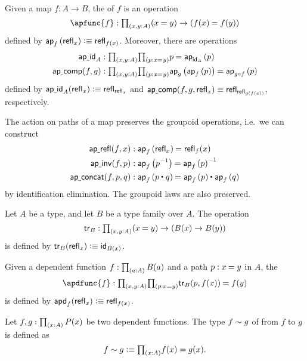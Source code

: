 Given a map $f:A\to B$, the  of $f$ is an operation
\begin{equation*}
\apfunc{f} : \prd{x,y:A} (\id{x}{y})\to(\id{f(x)}{f(y)})
\end{equation*}
defined by $\ap{f}{\refl{x}}\defeq\refl{f(x)}$. 
Moreover, there are operations
\begin{align*}
\apid_A & : \prd{x,y:A}{p:\id{x}{y}} \id{p}{\ap{\idfunc[A]}{p}} \\
\apcomp(f,g) & : \prd{x,y:A}{p:\id{x}{y}} \id{\ap{g}{\ap{f}{p}}}{\ap{g\circ f}{p}}
\end{align*}
defined by $\apid_A(\refl{x})\defeq \refl{\refl{x}}$ and $\apcomp(f,g,\refl{x})\jdeq \refl{\refl{g(f(x))}}$, respectively.

The action on paths of a map preserves the groupoid operations, i.e.~we can construct
\begin{align*}
\aprefl(f,x) & : \id{\ap{f}{\refl{x}}}{\refl{f}(x)} \\
\apinv(f,p) & : \id{\ap{f}{p^{-1}}}{\ap{f}{p}^{-1}} \\
\apconcat(f,p,q) & : \id{\ap{f}{\ct{p}{q}}}{\ct{\ap{f}{p}}{\ap{f}{q}}}
\end{align*}
by identification elimination. The groupoid laws are also preserved.

\begin{defn}
Let $A$ be a type, and let $B$ be a type family over $A$. The  operation
\begin{equation*}
\tr_B:\prd{x,y:A} (\id{x}{y})\to (B(x)\to B(y))
\end{equation*}
is defined by $\tr_B(\refl{x}) \defeq \idfunc[B(x)]$. 
\end{defn}

\begin{defn}\label{defn:apd}
Given a dependent function $f:\prd{a:A}B(a)$ and a path $p:\id{x}{y}$ in $A$, the 
\begin{equation*}
\apdfunc{f} : \prd{x,y:A}{p:x=y}\id{\tr_B(p,f(x))}{f(y)}
\end{equation*}
is defined by $\apd{f}{\refl{x}}\defeq \refl{f(x)}$.
\end{defn}

\begin{defn}
Let $f,g:\prd{x:A}P(x)$ be two dependent functions. The type $f\htpy g$ of  from $f$ to $g$ is defined as
\begin{equation*}
f\htpy g \defeq \prd{x:A} f(x)=g(x).
\end{equation*}
\end{defn}

